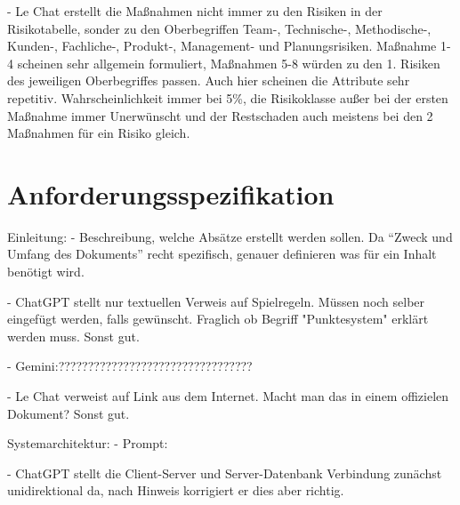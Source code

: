 - Le Chat erstellt die Maßnahmen nicht immer zu den Risiken in der Risikotabelle, sonder zu den Oberbegriffen Team-, Technische-, Methodische-, 
Kunden-, Fachliche-, Produkt-, Management- und Planungsrisiken. Maßnahme 1-4 scheinen sehr allgemein formuliert, Maßnahmen 5-8 würden
zu den 1. Risiken des jeweiligen Oberbegriffes passen. Auch hier scheinen die Attribute sehr repetitiv. Wahrscheinlichkeit immer bei 5\%,
die Risikoklasse außer bei der ersten Maßnahme immer Unerwünscht und der Restschaden auch meistens bei den 2 Maßnahmen für ein Risiko gleich.

\section{Anforderungsspezifikation}  \label{CompAnforderungsspezifikation}

Einleitung:
- Beschreibung, welche Absätze erstellt werden sollen. Da ``Zweck und Umfang des Dokuments'' recht spezifisch, genauer definieren was für ein 
Inhalt benötigt wird.

- ChatGPT stellt nur textuellen Verweis auf Spielregeln. Müssen noch selber eingefügt werden, falls gewünscht. Fraglich ob Begriff "Punktesystem"
erklärt werden muss. Sonst gut.

- Gemini:?????????????????????????????????

- Le Chat verweist auf Link aus dem Internet. Macht man das in einem offizielen Dokument? Sonst gut.


Systemarchitektur:
- Prompt:

- ChatGPT stellt die Client-Server und Server-Datenbank Verbindung zunächst unidirektional da, nach Hinweis korrigiert 
er dies aber richtig. 